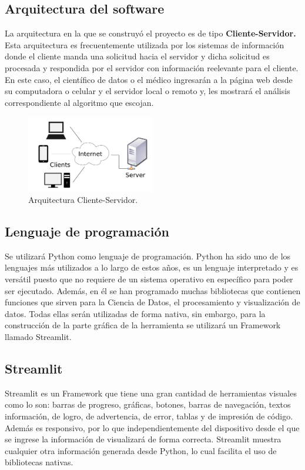 \documentclass{article}
\begin{document}
\subsection{Arquitectura del software}
La arquitectura en la que se construyó el proyecto es de tipo \textbf{Cliente-Servidor.} Esta arquitectura es frecuentemente
utilizada por los sistemas de información donde el cliente manda una solicitud hacia el servidor y dicha solicitud es procesada
y respondida por el servidor con información reelevante para el cliente. En este caso, el científico de datos o el médico ingresarán
a la página web desde su computadora o celular y el servidor local o remoto y, les mostrará el análisis correspondiente al algoritmo que
escojan.

\begin{figure}[!htb]
	\centering
	\includegraphics[width=0.5\textwidth]{figures/client-server.png}
	\caption{Arquitectura Cliente-Servidor.}
	\label{fig:client-server}
\end{figure}

\subsection{Lenguaje de programación}
Se utilizará Python como lenguaje de programación. Python ha sido uno de los lenguajes más utilizados a lo largo de estos años,
es un lenguaje interpretado y es versátil puesto que no requiere de un sistema operativo en específico para poder ser ejecutado. Además,
en él se han programado muchas bibliotecas que contienen funciones que sirven para la Ciencia de Datos, el procesamiento y visualización de datos.
Todas ellas serán utilizadas de forma nativa, sin embargo, para la construcción de la parte gráfica de la herramienta se utilizará un Framework
llamado Streamlit.


\subsection{Streamlit}
Streamlit es un Framework que tiene una gran cantidad de herramientas visuales como lo son: barras de progreso, gráficas, botones, barras de navegación,
textos información, de logro, de advertencia, de error, tablas y de impresión de código. Además es responsivo, por lo que independientemente del dispositivo
desde el que se ingrese la información de visualizará de forma correcta. Streamlit muestra cualquier otra información generada desde Python, lo cual facilita
el uso de bibliotecas nativas.
\end{document}
